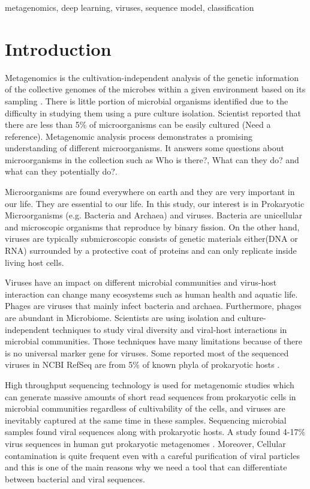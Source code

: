 \documentclass[conference]{IEEEtran}
\begin{document}
\begin{IEEEkeywords}
metagenomics, deep learning, viruses, sequence model, classification 
\end{IEEEkeywords}


\section{Introduction}

Metagenomics is the cultivation-independent analysis of the genetic information of the collective genomes of the microbes within a given environment based on its sampling \cite{izard2014metagenomics}. There is little portion of microbial organisms identified due to the difficulty in studying them using a pure culture isolation. Scientist reported that there are less than 5\% of microorganisms can be easily cultured (Need a reference).
Metagenomic analysis process demonstrates a promising understanding of different microorganisms. It answers some questions about microorganisms in the collection such as Who is there?, What can they do? and what can they potentially do?.



Microorganisms are found everywhere on earth and they are very important in our life. They are essential to our life. In this study, our interest is in Prokaryotic Microorganisms
(e.g. Bacteria and Archaea) and viruses. Bacteria are unicellular and microscopic organisms that reproduce by binary fission. On the other hand, viruses are typically submicroscopic consists of genetic materials either(DNA or RNA) surrounded by a protective coat of proteins and can only replicate inside living host cells. 

Viruses have an impact on different microbial communities and virus-host interaction can change many ecosystems such as human health and aquatic life. Phages are viruses that mainly infect bacteria and archaea. Furthermore, phages are abundant in Microbiome. Scientists are using isolation and culture-independent techniques to study viral diversity and viral-host interactions in microbial communities. Those techniques have many limitations because of there is no universal marker gene for viruses. Some reported most of the sequenced viruses in NCBI RefSeq are from 5\% of known phyla of prokaryotic hosts \cite{roux2015viral}.

High throughput sequencing technology is used for metagenomic studies which can generate massive amounts of short read sequences from prokaryotic cells in microbial communities regardless of cultivability of the cells, and viruses are inevitably captured at the same time in these samples. Sequencing microbial samples found viral sequences along with prokaryotic hosts. A study found 4-17\% virus sequences in human gut prokaryotic metagenomes \cite{minot2011human}. Moreover, Cellular contamination is quite frequent even with a careful purification of viral particles and this is one of the main reasons why we need a tool that can differentiate between bacterial and viral sequences.
\end{document}
